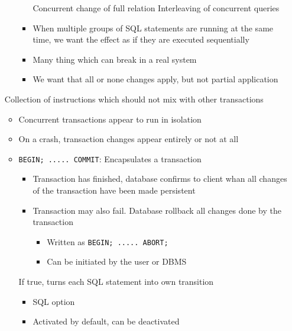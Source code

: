 \begin{itemize}
\begin{itemize}
\begin{itemize}
                     Concurrent change of full relation
                     Interleaving of concurrent queries
                    \item When multiple groups of SQL statements are running at the same time, we want the effect as if they are executed sequentially
                \end{itemize}
                \begin{itemize}
                    \item Many thing which can break in a real system
                    \item We want that all or none changes apply, but not partial application
                \end{itemize}
        \end{itemize}
     Collection of instructions which should not mix with other transactions
        \begin{itemize}
            \item Concurrent transactions appear to run in isolation
            \item On a crash, transaction changes appear entirely or not at all
            \item \verb+BEGIN; ..... COMMIT+: Encapsulates a transaction
                \begin{itemize}
                    \item Transaction has finished, database confirms to client whan all changes of the transaction have been made persistent
                    \item Transaction may also fail. Database rollback all changes done by the transaction
                        \begin{itemize}
                            \item Written as \verb+BEGIN; ..... ABORT;+
                            \item Can be initiated by the user or DBMS
                        \end{itemize}
                \end{itemize}
             If true, turns each SQL statement into own transition
                \begin{itemize}
                    \item SQL option
                    \item Activated by default, can be deactivated
                \end{itemize}
        \end{itemize}
\end{itemize}


